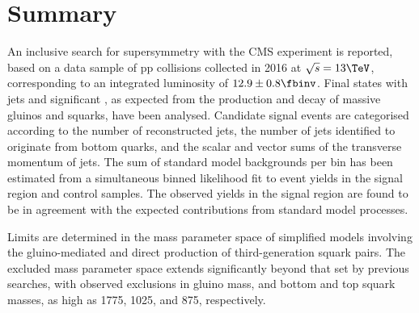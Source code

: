 \section{Summary}
\label{sec:summary}

An inclusive search for supersymmetry with the CMS experiment is
reported, based on a data sample of pp collisions collected in 2016 at
$\sqrt{s} = 13\TeV$, corresponding to an integrated luminosity of
$12.9 \pm 0.8 \fbinv$. Final states with jets and significant
\ptvecmiss, as expected from the production and decay of massive
gluinos and squarks, have been analysed. Candidate signal events are
categorised according to the number of reconstructed jets, the number
of jets identified to originate from bottom quarks, and the scalar and
vector sums of the transverse momentum of jets. The sum of standard
model backgrounds per bin has been estimated from a simultaneous
binned likelihood fit to event yields in the signal region and control
samples. The observed yields in the signal region are found to be in
agreement with the expected contributions from standard model
processes.

Limits are determined in the mass parameter space of simplified models
involving the gluino-mediated and direct production of
third-generation squark pairs. The excluded mass parameter space
extends significantly beyond that set by previous searches, with
observed exclusions in gluino mass, and bottom and top squark masses,
as high as 1775, 1025, and 875\GeV, respectively.

